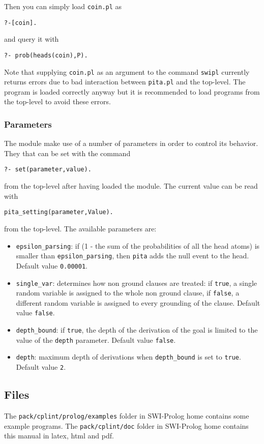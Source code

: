 \documentclass[a4paper,10pt]{article}
\begin{document}
Then you can simply load \texttt{coin.pl} as
\begin{verbatim}
?-[coin].
\end{verbatim}
and query it with
\begin{verbatim}
?- prob(heads(coin),P).
\end{verbatim}
Note that supplying \texttt{coin.pl} as an argument to the command \texttt{swipl} currently returns errors due to bad interaction between \texttt{pita.pl} and the top-level.
The program is loaded correctly anyway but it is recommended to load programs from the top-level to avoid these errors.



\subsubsection{Parameters}
The module make use of a number of parameters in order to control its behavior. They that can be set with the command
\begin{verbatim}
?- set(parameter,value).
\end{verbatim}
from the top-level after having loaded the module.
The current value can be read with
\begin{verbatim}
pita_setting(parameter,Value).
\end{verbatim}
from the top-level.
The available parameters are:
\begin{itemize}
\item 
	 \verb|epsilon_parsing|: if (1 - the sum of the probabilities of all the head atoms) is smaller than 
    \verb|epsilon_parsing|,
		then \texttt{pita} adds the null event to the head. Default value \texttt{0.00001}.
\item \verb|single_var|: determines how non ground clauses are treated: if \texttt{true}, a single random variable is assigned to the whole non ground clause, 
if \texttt{false}, a different random variable is assigned to every grounding of the clause. Default value \texttt{false}.
\item \verb|depth_bound|: if \texttt{true}, the depth of the derivation of the goal is limited to the value of the \texttt{depth} parameter.  Default value \texttt{false}.
\item  \texttt{depth}: maximum depth of derivations when  \verb|depth_bound| is set to \texttt{true}. Default value \texttt{2}.
\end{itemize}



\subsection{Files}
The \texttt{pack/cplint/prolog/examples} folder in SWI-Prolog home contains some example programs.
The \texttt{pack/cplint/doc} folder in SWI-Prolog home contains this manual in latex, html and pdf.
\end{document}
